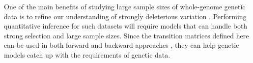 \documentclass[9pt,twocolumn,twoside,lineno]{gsajnl}
\newcommand{\afs}[2]{\Phi_{#1}^{(#2)}}
\begin{document}







One of the main benefits of studying large sample sizes of whole-genome genetic data is to refine
our understanding of strongly deleterious variation \citep{karczewski2020mutational}. Performing
quantitative inference for such datasets will require models that can handle both strong selection
and large sample sizes.  Since the transition matrices defined here can be used in both forward
\citep{JouganousEtAl2017} and backward approaches \citep{KammEtAl2017}, they can help genetic models
catch up with the requirements of genetic data.
\end{document}

